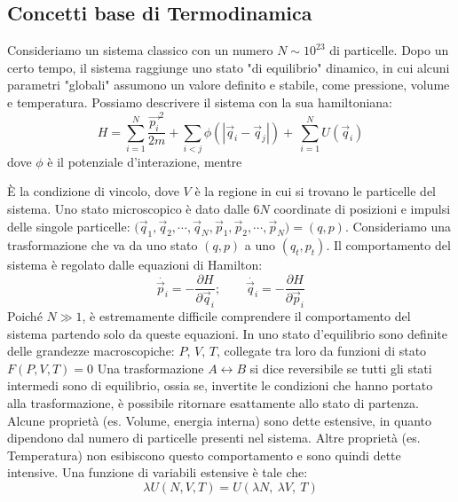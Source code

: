 \documentclass[12pt]{article}
\begin{document}
\subsection{Concetti base di Termodinamica}
Consideriamo un sistema classico con un numero $N\sim{10}^{23}$ di particelle. Dopo un certo tempo, il sistema raggiunge uno stato "di equilibrio" dinamico, in cui alcuni parametri "globali" assumono un valore definito e stabile, come pressione, volume e temperatura.
Possiamo descrivere il sistema con la sua hamiltoniana: 
\[H=\sum_{i=1}^{N}\frac{{\vec{p_i}}^2}{2m}+\sum_{i<j}{\phi\left(\left|{\vec{q}}_i-{\vec{q}}_j\right|\right)+\ \sum_{i=1}^{N}{U({\vec{q}}_i)}}\]
dove $\phi$ è il potenziale d'interazione, mentre

È la condizione di vincolo, dove $V$ è la regione in cui si trovano le particelle del sistema.
Uno stato microscopico è dato dalle $6N$ coordinate di posizioni e impulsi delle singole particelle:
${(\vec{q}}_1,{\vec{q}}_2,\cdots,{\vec{q}}_N,{\vec{p}}_1,{\vec{p}}_2,\cdots,{\vec{p}}_N)=(q,p)$.
Consideriamo una trasformazione che va da uno stato $(q,p)$ a uno $(q_t, p_t)$. Il comportamento del sistema è regolato dalle equazioni di Hamilton:
\[\dot{{\vec{p}}_i}=-\frac{\partial H}{\partial{\vec{q}}_i}; \quad \quad \dot{{\vec{q}}_i}=-\frac{\partial H}{\partial{\vec{p}}_i}\]
Poiché $N\gg1$, è estremamente difficile comprendere il comportamento del sistema partendo solo da queste equazioni.
In uno stato d'equilibrio sono definite delle grandezze macroscopiche: $P$, $V$, $T$, collegate tra loro da funzioni di stato $F\left(P,V,T\right)=0$
Una trasformazione $A\leftrightarrow B$ si dice reversibile se tutti gli stati intermedi sono di equilibrio, ossia se, invertite le condizioni che hanno portato alla trasformazione, è possibile ritornare esattamente allo stato di partenza.\\
Alcune proprietà (es. Volume, energia interna) sono dette estensive, in quanto dipendono dal numero di particelle presenti nel sistema. Altre proprietà (es. Temperatura) non esibiscono questo comportamento e sono quindi dette intensive.
Una funzione di variabili estensive è tale che:
\[ \lambda U\left(N,V,T\right)=U(\lambda N,\ \lambda V,\ T)\]
\end{document}
